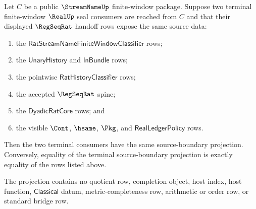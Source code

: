 \begin{theorem}
\label{thm:streamname-real-regseq-terminal-source-uniqueness}
Let $C$ be a public $\StreamNameUp$ finite-window package. Suppose two
terminal finite-window $\RealUp$ seal consumers are reached from $C$ and that
their displayed $\RegSeqRat$ handoff rows expose the same source data:
\begin{enumerate}
  \item the $\mathsf{RatStreamNameFiniteWindowClassifier}$ rows;
  \item the $\mathsf{UnaryHistory}$ and $\mathsf{InBundle}$ rows;
  \item the pointwise $\mathsf{RatHistoryClassifier}$ rows;
  \item the accepted $\RegSeqRat$ spine;
  \item the $\mathsf{DyadicRatCore}$ rows; and
  \item the visible $\Cont$, $\hsame$, $\Pkg$, and
  $\mathsf{RealLedgerPolicy}$ rows.
\end{enumerate}
Then the two terminal consumers have the same source-boundary projection.
Conversely, equality of the terminal source-boundary projection is exactly
equality of the rows listed above.

The projection contains no quotient row, completion object, host index, host
function, $\mathsf{Classical}$ datum, metric-completeness row, arithmetic or
order row, or standard bridge row.
\end{theorem}
